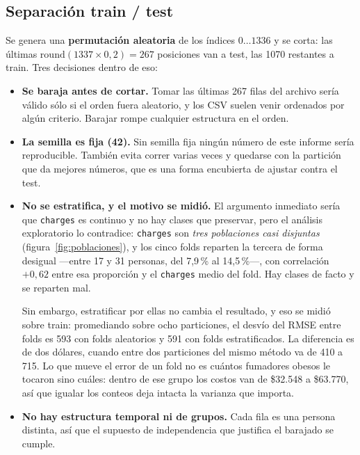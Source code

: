 \documentclass[11pt,a4paper]{article}
\begin{document}
\subsection{Separación train / test}

Se genera una \textbf{permutación aleatoria} de los índices $0\ldots1336$ y se corta: las
últimas $\mathrm{round}(1337 \times 0{,}2) = 267$ posiciones van a test, las 1070 restantes a
train. Tres decisiones dentro de eso:

\begin{itemize}
  \item \textbf{Se baraja antes de cortar.} Tomar las últimas 267 filas del archivo sería
        válido sólo si el orden fuera aleatorio, y los CSV suelen venir ordenados por algún
        criterio. Barajar rompe cualquier estructura en el orden.
  \item \textbf{La semilla es fija (42).} Sin semilla fija ningún número de este informe sería
        reproducible. También evita correr varias veces y quedarse con la partición que da
        mejores números, que es una forma encubierta de ajustar contra el test.
  \item \textbf{No se estratifica, y el motivo se midió.} El argumento inmediato sería que
        \texttt{charges} es continuo y no hay clases que preservar, pero el análisis
        exploratorio lo contradice: \texttt{charges} son \emph{tres poblaciones casi disjuntas}
        (figura~\ref{fig:poblaciones}), y los cinco folds reparten la tercera de forma desigual
        ---entre 17 y 31 personas, del 7{,}9\,\% al 14{,}5\,\%---, con correlación $+0{,}62$
        entre esa proporción y el \texttt{charges} medio del fold. Hay clases de facto y se
        reparten mal.

        Sin embargo, estratificar por ellas no cambia el resultado, y eso se midió sobre train:
        promediando sobre ocho particiones, el desvío del RMSE entre folds es 593 con folds
        aleatorios y 591 con folds estratificados. La diferencia es de dos dólares, cuando
        entre dos particiones del mismo método va de 410 a 715. Lo que mueve el error de un
        fold no es cuántos fumadores obesos le tocaron sino cuáles: dentro de ese grupo los
        costos van de \$32.548 a \$63.770, así que igualar los conteos deja intacta la varianza
        que importa.

  \item \textbf{No hay estructura temporal ni de grupos.} Cada fila es una persona distinta,
        así que el supuesto de independencia que justifica el barajado se cumple.
\end{itemize}
\end{document}
